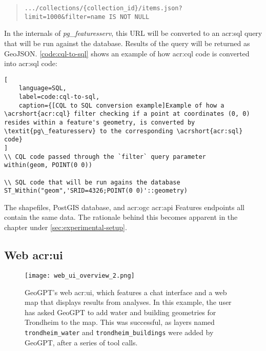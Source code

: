 \begin{quote}
    \texttt{.../collections/\{collection\_id\}/items.json?limit=1000\&filter=name IS NOT NULL}
\end{quote}

In the internals of \textit{pg\_featuresserv}, this URL will be converted to an \acrshort{acr:sql} query that will be run against the database. Results of the query will be returned as GeoJSON. \autoref{code:cql-to-sql} shows an example of how \acrshort{acr:cql} code is converted into \acrshort{acr:sql} code:

\begin{lstlisting}[
    language=SQL,
    label=code:cql-to-sql,
    caption={[CQL to SQL conversion example]Example of how a \acrshort{acr:cql} filter checking if a point at coordinates (0, 0) resides within a feature's geometry, is converted by \textit{pg\_featuresserv} to the corresponding \acrshort{acr:sql} code} 
]
\\ CQL code passed through the `filter` query parameter
within(geom, POINT(0 0))

\\ SQL code that will be run agains the database
ST_Within("geom",'SRID=4326;POINT(0 0)'::geometry)
\end{lstlisting}

The shapefiles, PostGIS database, and \acrshort{acr:ogc} \acrshort{acr:api} Features endpoints all contain the same data. The rationale behind this becomes apparent in the  chapter under \autoref{sec:experimental-setup}.

\subsection[Web UI]{Web \acrshort{acr:ui}}
\label{subsec:web-ui}

\begin{figure}[h]
    \centering
    \texttt{[image: web\_ui\_overview\_2.png]}
    \caption[GeoGPT's web UI]{GeoGPT's web \acrshort{acr:ui}, which features a chat interface and a web map that displays results from analyses. In this example, the user has asked GeoGPT to add water and building geometries for Trondheim to the map. This was successful, as layers named \texttt{trondheim\_water} and \texttt{trondheim\_buildings} were added by GeoGPT, after a series of tool calls.}
    \label{fig:web-ui}
\end{figure}

